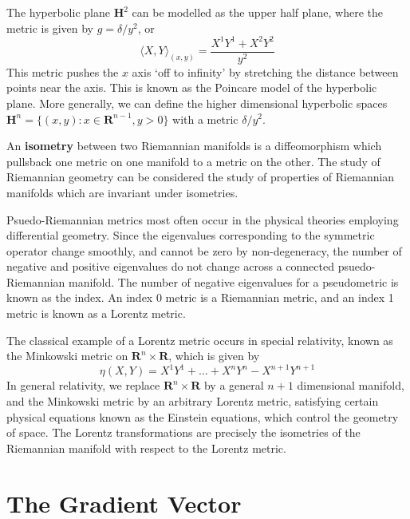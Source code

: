 \begin{example}
    The hyperbolic plane $\mathbf{H}^2$ can be modelled as the upper half plane, where the metric is given by $g = \delta/y^2$, or
    \[ \langle X, Y \rangle_{(x,y)} = \frac{X^1Y^1 + X^2Y^2}{y^2} \]
    This metric pushes the $x$ axis `off to infinity' by stretching the distance between points near the axis. This is known as the Poincare model of the hyperbolic plane. More generally, we can define the higher dimensional hyperbolic spaces $\mathbf{H}^n = \{ (x,y): x \in \mathbf{R}^{n-1}, y > 0 \}$ with a metric $\delta/y^2$.
\end{example}

An {\bf isometry} between two Riemannian manifolds is a diffeomorphism which pullsback one metric on one manifold to a metric on the other. The study of Riemannian geometry can be considered the study of properties of Riemannian manifolds which are invariant under isometries.

Psuedo-Riemannian metrics most often occur in the physical theories employing differential geometry. Since the eigenvalues corresponding to the symmetric operator change smoothly, and cannot be zero by non-degeneracy, the number of negative and positive eigenvalues do not change across a connected psuedo-Riemannian manifold. The number of negative eigenvalues for a pseudometric is known as the index. An index 0 metric is a Riemannian metric, and an index 1 metric is known as a Lorentz metric.

\begin{example}
    The classical example of a Lorentz metric occurs in special relativity, known as the Minkowski metric on $\mathbf{R}^n \times \mathbf{R}$, which is given by
    \[ \eta(X,Y) = X^1Y^1 + \dots + X^nY^n - X^{n+1}Y^{n+1} \]
    In general relativity, we replace $\mathbf{R}^n \times \mathbf{R}$ by a general $n+1$ dimensional manifold, and the Minkowski metric by an arbitrary Lorentz metric, satisfying certain physical equations known as the Einstein equations, which control the geometry of space. The Lorentz transformations are precisely the isometries of the Riemannian manifold with respect to the Lorentz metric.
\end{example}

\section{The Gradient Vector}

